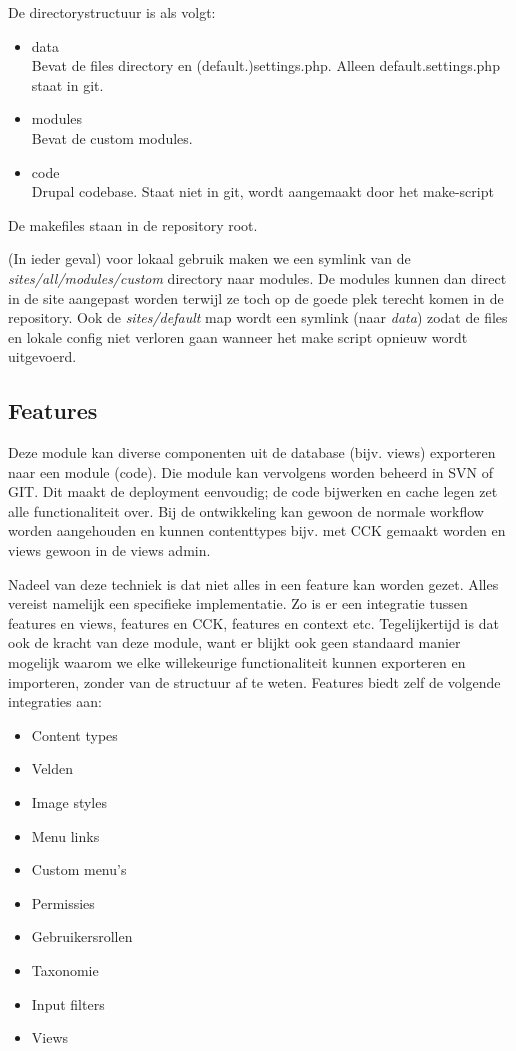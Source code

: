 De directorystructuur is als volgt:

\begin{itemize}
\item data \\
    Bevat de files directory en (default.)settings.php. Alleen default.settings.php staat in git.
\item modules \\
    Bevat de custom modules.
\item code \\
    Drupal codebase. Staat niet in git, wordt aangemaakt door het make-script
\end{itemize}

De makefiles staan in de repository root.

(In ieder geval) voor lokaal gebruik maken we een symlink van de \emph{sites/all/modules/custom} directory naar {modules}. De modules kunnen dan direct in de site aangepast worden terwijl ze toch op de goede plek terecht komen in de repository. Ook de \emph{sites/default} map wordt een symlink (naar \emph{data}) zodat de files en lokale config niet verloren gaan wanneer het make script opnieuw wordt uitgevoerd.

\subsection{Features}

Deze module kan diverse componenten uit de database (bijv. views) exporteren naar een  module (code). Die module kan vervolgens worden beheerd in SVN of GIT. Dit maakt de deployment eenvoudig; de code bijwerken en cache legen zet alle functionaliteit over. Bij de ontwikkeling kan gewoon de normale workflow worden aangehouden en kunnen contenttypes bijv. met CCK gemaakt worden en views gewoon in de views admin.

Nadeel van deze techniek is dat niet alles in een feature kan worden gezet. Alles vereist namelijk een specifieke implementatie. Zo is er een integratie tussen features en views, features en CCK, features en context etc. Tegelijkertijd is dat ook de kracht van deze module, want er blijkt ook geen standaard manier mogelijk waarom we elke willekeurige functionaliteit kunnen exporteren en importeren, zonder van de structuur af te weten. Features biedt zelf de volgende integraties aan:

\begin{itemize}
  \item Content types
  \item Velden
  \item Image styles
  \item Menu links
  \item Custom menu's
  \item Permissies
  \item Gebruikersrollen
  \item Taxonomie
  \item Input filters
  \item Views
\end{itemize}

